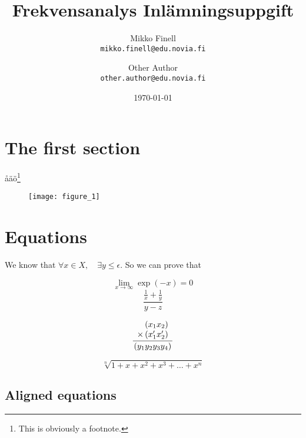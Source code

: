\documentclass[a4paper,12pt]{article}
\author{Mikko Finell
\\ \texttt{mikko.finell@edu.novia.fi}
\and 
Other Author
\\ \texttt{other.author@edu.novia.fi}
}
\title{Frekvensanalys Inlämningsuppgift}
\date{\today}
\begin{document}
\maketitle
\tableofcontents
\thispagestyle{empty}
\newpage
\setcounter{page}{1}


\section{The first section}
åäö\footnote{This is obviously a footnote.}

\begin{figure}[h]
\centering
\texttt{[image: figure\_1]}
\end{figure}


\section{Equations}
We know that $\forall x \in X, \quad \exists y \leq \epsilon$. So we can prove that

$$\lim\limits_{x \to \infty} \exp(-x) = 0$$
$$\frac{\frac{1}{x}+\frac{1}{y}}{y-z}$$

\begin{equation}
\frac{
    \begin{array}[b]{r}
      \left( x_1 x_2 \right)\\
      \times \left( x'_1 x'_2 \right)
    \end{array}
  }{
    \left( y_1y_2y_3y_4 \right)
  }
\end{equation}

\begin{equation}
\sqrt[n]{1+x+x^2+x^3+\dots+x^n}
\end{equation}

\subsection*{Aligned equations}
\end{document}
